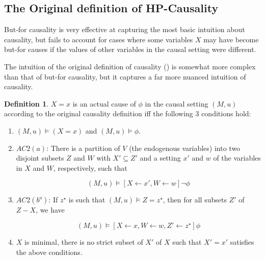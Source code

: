 \documentclass{article}
\theoremstyle{plain}
\theoremstyle{definition}
\newtheorem{defn}[thm]{Definition} %
\begin{document}
\subsection{The Original definition of HP-Causality}

But-for causality is very effective at capturing the most basic intuition about causality, but fails to account for cases where some variables $X$ may have become but-for causes if the values of other variables in the causal setting were different.

The intuition of the original definition of causality (\cite{halpern2005causes}) is somewhat more complex than that of but-for causality, but it captures a far more nuanced intuition of causality.

\begin{defn}$X=x$ is an actual cause of $\phi$ in the causal setting $(M,u)$ according to the original causality definition iff the following 3 conditions hold:
\begin{enumerate}
\item $(M,u) \models (X=x)$ and $(M,u) \models \phi$.
\item $AC2(a)$: There is a partition of $V$ (the endogenous variables) into two disjoint subsets $Z$ and $W$ with $X'\subseteq Z'$ and a setting $x'$ and $w$ of the variables in $X$ and $W$, respectively, such that

\[
(M,u) \models [X\leftarrow x', W\leftarrow w]\lnot \phi
\] 

\item $AC2(b^o)$: If $z^\star$ is such that $(M,u)\models Z = z^\star$, then for all subsets $Z'$ of $Z-X$, we have

\[
(M,u) \models [X\leftarrow x, W \leftarrow w, Z' \leftarrow z^\star]\phi
\] 

\item $X$ is minimal, there is no strict subset of $X'$ of $X$ such that $X' = x'$ satisfies the above conditions.
\end{enumerate}

\end{defn}
\end{document}
